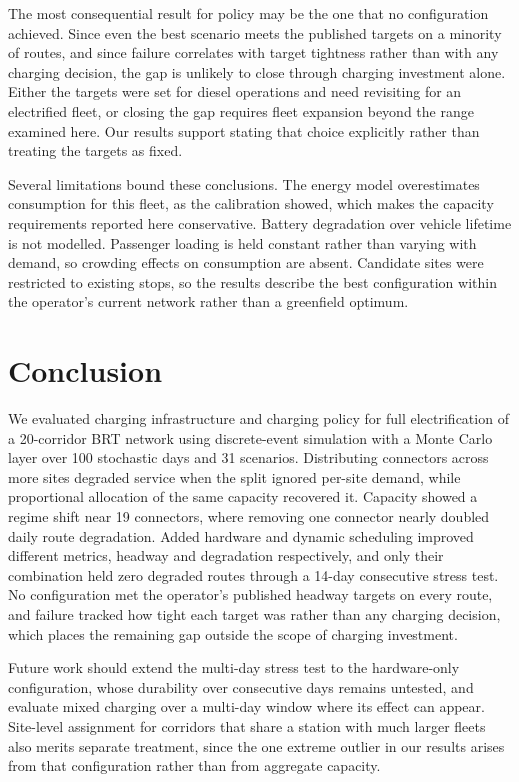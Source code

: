 \documentclass[conference]{IEEEtran}
\begin{document}
The most consequential result for policy may be the one that no
configuration achieved. Since even the best scenario meets the published
targets on a minority of routes, and since failure correlates with target
tightness rather than with any charging decision, the gap is unlikely to
close through charging investment alone. Either the targets were set for
diesel operations and need revisiting for an electrified fleet, or
closing the gap requires fleet expansion beyond the range examined here.
Our results support stating that choice explicitly rather than treating
the targets as fixed.

Several limitations bound these conclusions. The energy model
overestimates consumption for this fleet, as the calibration showed,
which makes the capacity requirements reported here conservative. Battery
degradation over vehicle lifetime is not modelled. Passenger loading is
held constant rather than varying with demand, so crowding effects on
consumption are absent. Candidate sites were restricted to existing
stops, so the results describe the best configuration within the
operator's current network rather than a greenfield optimum.

\section{Conclusion}

We evaluated charging infrastructure and charging policy for full
electrification of a 20-corridor BRT network using discrete-event
simulation with a Monte Carlo layer over 100 stochastic days and 31
scenarios. Distributing connectors across more sites degraded service
when the split ignored per-site demand, while proportional allocation of
the same capacity recovered it. Capacity showed a regime shift near 19
connectors, where removing one connector nearly doubled daily route
degradation. Added hardware and dynamic scheduling improved different
metrics, headway and degradation respectively, and only their combination
held zero degraded routes through a 14-day consecutive stress test. No
configuration met the operator's published headway targets on every
route, and failure tracked how tight each target was rather than any
charging decision, which places the remaining gap outside the scope of
charging investment.

Future work should extend the multi-day stress test to the
hardware-only configuration, whose durability over consecutive days
remains untested, and evaluate mixed charging over a multi-day window
where its effect can appear. Site-level assignment for corridors that
share a station with much larger fleets also merits separate treatment,
since the one extreme outlier in our results arises from that
configuration rather than from aggregate capacity.
\end{document}
